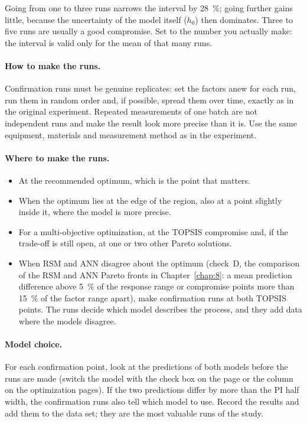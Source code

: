Going from one to three runs narrows the interval by 28~\%; going further gains little, because the uncertainty of
the model itself ($h_0$) then dominates. Three to five runs are usually a good compromise. Set
 to the number you actually make: the interval is valid only for the mean of
that many runs.

\paragraph{How to make the runs.} Confirmation runs must be genuine replicates: set the factors anew for each run,
run them in random order and, if possible, spread them over time, exactly as in the original experiment. Repeated
measurements of one batch are not independent runs and make the result look more precise than it is. Use the same
equipment, materials and measurement method as in the experiment.

\paragraph{Where to make the runs.}
\begin{itemize}
  \item At the recommended optimum, which is the point that matters.
  \item When the optimum lies at the edge of the region, also at a point slightly inside it, where the model is more
    precise.
  \item For a multi-objective optimization, at the TOPSIS compromise and, if the trade-off is still open, at one or
    two other Pareto solutions.
  \item When RSM and ANN disagree about the optimum (check~D, the comparison of the RSM and ANN Pareto fronts in
    Chapter~\ref{chap:8}: a mean prediction difference above 5~\% of the response range or compromise points more than 15~\%
    of the factor range apart), make confirmation runs at both TOPSIS points. The runs decide which model describes
    the process, and they add data where the models disagree.
\end{itemize}

\paragraph{Model choice.} For each confirmation point, look at the predictions of both models before the runs are
made (switch the model with the check box on the  page or the  column on the optimization pages).
If the two predictions differ by more than the PI half width, the confirmation runs also tell which model to
use. Record the results and add them to the data set; they are the most valuable runs of the study.
